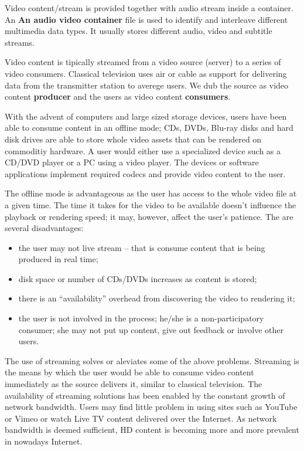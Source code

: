 Video content/stream is provided together with audio stream inside a
container. An \textbf{An audio video container} file is used to identify and
interleave different multimedia data types. It usually stores different audio,
video and subtitle streams.

Video content is tipically streamed from a video source (server) to a series
of video consumers. Classical television uses air or cable as support for
delivering data from the transmitter station to averege users. We dub the
source as video content \textbf{producer} and the users as video content
\textbf{consumers}.

With the advent of computers and large sized storage devices, users have been
able to consume content in an offline mode; CDs, DVDs, Blu-ray disks and hard
disk drives are able to store whole video assets that can be rendered on
commoditiy hardware. A user would either use a specialized device such as a
CD/DVD player or a PC using a video player. The devices or software
applications implement required codecs and provide video content to the user.

The offline mode is advantageous as the user has access to the whole video
file at a given time. The time it takes for the video to be available doesn't
influence the playback or rendering speed; it may, however, affect the user's
patience. The are several disadvantages:
\begin{itemize}
  \item the user may not live stream -- that is consume content that is being
  produced in real time;
  \item disk space or number of CDs/DVDs increases as content is stored;
  \item there is an ``availability'' overhead from discovering the video to
  rendering it;
  \item the user is not involved in the process; he/she is a non-participatory
  consumer; she may not put up content, give out feedback or involve other
  users.
\end{itemize}

The use of streaming solves or aleviates some of the above problems. Streaming
is the means by which the user would be able to consume video content
immediately as the source delivers it, similar to classical television. The
availability of streaming solutions has been enabled by the constant growth of
network bandwidth. Users may find little problem in using sites such as
YouTube or Vimeo or watch Live TV content delivered over the Internet. As
network bandwidth is deemed sufficient, HD content is becoming more and more
prevalent in nowadays Internet.

